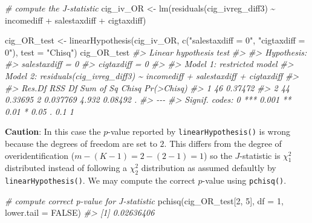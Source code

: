 \documentclass[
  14pt,
]{memoir}
\newenvironment{Shaded}{\begin{snugshade}}{\end{snugshade}}
\newcommand{\AttributeTok}[1]{\textcolor[rgb]{0.77,0.63,0.00}{#1}}
\newcommand{\CommentTok}[1]{\textcolor[rgb]{0.56,0.35,0.01}{\textit{#1}}}
\newcommand{\ConstantTok}[1]{\textcolor[rgb]{0.00,0.00,0.00}{#1}}
\newcommand{\DecValTok}[1]{\textcolor[rgb]{0.00,0.00,0.81}{#1}}
\newcommand{\FunctionTok}[1]{\textcolor[rgb]{0.00,0.00,0.00}{#1}}
\newcommand{\NormalTok}[1]{#1}
\newcommand{\OtherTok}[1]{\textcolor[rgb]{0.56,0.35,0.01}{#1}}
\newcommand{\SpecialCharTok}[1]{\textcolor[rgb]{0.00,0.00,0.00}{#1}}
\newcommand{\StringTok}[1]{\textcolor[rgb]{0.31,0.60,0.02}{#1}}
\begin{document}
\begin{Shaded}
\begin{Highlighting}[]
\CommentTok{\# compute the J{-}statistic}
\NormalTok{cig\_iv\_OR }\OtherTok{\textless{}{-}} \FunctionTok{lm}\NormalTok{(}\FunctionTok{residuals}\NormalTok{(cig\_ivreg\_diff3) }\SpecialCharTok{\textasciitilde{}}\NormalTok{ incomediff }\SpecialCharTok{+} 
\NormalTok{                                 salestaxdiff }\SpecialCharTok{+}\NormalTok{ cigtaxdiff)}

\NormalTok{cig\_OR\_test }\OtherTok{\textless{}{-}} \FunctionTok{linearHypothesis}\NormalTok{(cig\_iv\_OR, }
                               \FunctionTok{c}\NormalTok{(}\StringTok{"salestaxdiff = 0"}\NormalTok{, }
                                 \StringTok{"cigtaxdiff = 0"}\NormalTok{), }
                               \AttributeTok{test =} \StringTok{"Chisq"}\NormalTok{)}
\NormalTok{cig\_OR\_test}
\CommentTok{\#\textgreater{} Linear hypothesis test}
\CommentTok{\#\textgreater{} }
\CommentTok{\#\textgreater{} Hypothesis:}
\CommentTok{\#\textgreater{} salestaxdiff = 0}
\CommentTok{\#\textgreater{} cigtaxdiff = 0}
\CommentTok{\#\textgreater{} }
\CommentTok{\#\textgreater{} Model 1: restricted model}
\CommentTok{\#\textgreater{} Model 2: residuals(cig\_ivreg\_diff3) \textasciitilde{} incomediff + salestaxdiff + cigtaxdiff}
\CommentTok{\#\textgreater{} }
\CommentTok{\#\textgreater{}   Res.Df     RSS Df Sum of Sq Chisq Pr(\textgreater{}Chisq)  }
\CommentTok{\#\textgreater{} 1     46 0.37472                                }
\CommentTok{\#\textgreater{} 2     44 0.33695  2  0.037769 4.932    0.08492 .}
\CommentTok{\#\textgreater{} {-}{-}{-}}
\CommentTok{\#\textgreater{} Signif. codes:  0 \textquotesingle{}***\textquotesingle{} 0.001 \textquotesingle{}**\textquotesingle{} 0.01 \textquotesingle{}*\textquotesingle{} 0.05 \textquotesingle{}.\textquotesingle{} 0.1 \textquotesingle{} \textquotesingle{} 1}
\end{Highlighting}
\end{Shaded}

\textbf{Caution}: In this case the \(p\)-value reported by \texttt{linearHypothesis()} is wrong because the degrees of freedom are set to \(2\). This differs from the degree of overidentification (\(m-(K-1)=2-(2-1)=1\)) so the \(J\)-statistic is \(\chi^2_1\) distributed instead of following a \(\chi^2_2\) distribution as assumed defaultly by \texttt{linearHypothesis()}. We may compute the correct \(p\)-value using \texttt{pchisq()}.

\begin{Shaded}
\begin{Highlighting}[]
\CommentTok{\# compute correct p{-}value for J{-}statistic}
\FunctionTok{pchisq}\NormalTok{(cig\_OR\_test[}\DecValTok{2}\NormalTok{, }\DecValTok{5}\NormalTok{], }\AttributeTok{df =} \DecValTok{1}\NormalTok{, }\AttributeTok{lower.tail =} \ConstantTok{FALSE}\NormalTok{)}
\CommentTok{\#\textgreater{} [1] 0.02636406}
\end{Highlighting}
\end{Shaded}
\end{document}
